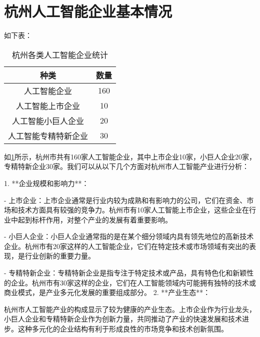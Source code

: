 \documentclass[UTF8,twocolumn]{ctexart}
\begin{document}
\section{杭州人工智能企业基本情况}
如下表：
\begin{table}[htbp]
  \centering
    \begin{tabular}{c | c}
      \toprule
      种类 & 数量 \\
      \midrule
      人工智能企业 & 160 \\
      \midrule
      人工智能上市企业 & 10 \\
      \midrule
      人工智能小巨人企业 & 20\\
      \midrule
      人工智能专精特新企业 & 30\\
      \bottomrule
  \end{tabular}
  \caption{杭州各类人工智能企业统计}%
  \label{tab:mytable1}%
\end{table}
如\ref{tab:mytable1}所示，杭州市共有160家人工智能企业，其中上市企业10家，小巨人企业20家，专精特新企业30家。我们可以从以下几个方面对杭州市人工智能产业进行分析：

1. **企业规模和影响力**：

   - 上市企业：上市企业通常是行业内较为成熟和有影响力的公司，它们在资金、市场和技术方面具有较强的竞争力。杭州市有10家人工智能上市企业，这些企业在行业中起到标杆作用，对整个产业的发展有着重要影响。

   - 小巨人企业：小巨人企业通常指的是在某个细分领域内具有领先地位的高新技术企业。杭州市有20家这样的人工智能企业，它们在特定技术或市场领域有突出的表现，是行业创新的重要力量。

   - 专精特新企业：专精特新企业是指专注于特定技术或产品，具有特色化和新颖性的企业。杭州市有30家这样的企业，它们在人工智能领域内可能拥有独特的技术或商业模式，是产业多元化发展的重要组成部分。
2. **产业生态**：

   杭州市人工智能产业的构成显示了较为健康的产业生态。上市企业作为行业龙头，小巨人企业和专精特新企业作为创新力量，共同推动了产业的快速发展和技术进步。这种多元化的企业结构有利于形成良性的市场竞争和技术创新氛围。
\end{document}
